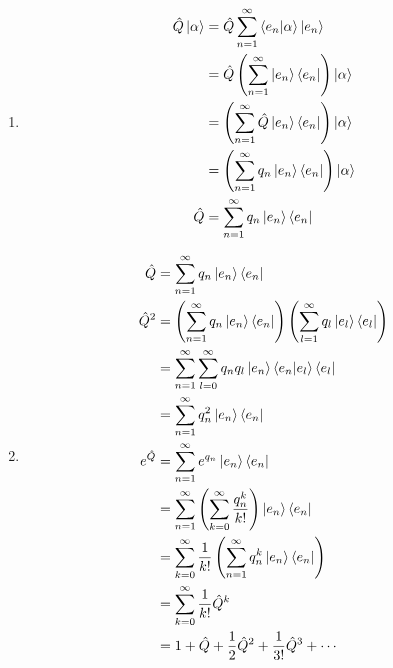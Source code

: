 \documentclass{article}
\begin{document}
\subsection{}

\begin{enumerate}
  \item

        \begin{align*}
          \hat{Q} \ket{\alpha} & = \hat{Q} \sum_{n = 1}^\infty \braket{e_n | \alpha} \ket{e_n}                 \\
                               & = \hat{Q} \left( \sum_{n = 1}^\infty \ket{e_n} \bra{e_n} \right) \ket{\alpha} \\
                               & = \left( \sum_{n = 1}^\infty \hat{Q} \ket{e_n} \bra{e_n} \right) \ket{\alpha} \\
                               & = \left( \sum_{n = 1}^\infty q_n \ket{e_n} \bra{e_n} \right) \ket{\alpha}     \\
          \hat{Q}              & = \sum_{n = 1}^\infty q_n \ket{e_n} \bra{e_n}
        \end{align*}

  \item

        \begin{align*}
          \hat{Q}     & = \sum_{n = 1}^\infty q_n \ket{e_n} \bra{e_n}                                                                           \\
          \hat{Q}^2   & = \left( \sum_{n = 1}^\infty q_n \ket{e_n} \bra{e_n} \right) \left( \sum_{l = 1}^\infty q_l \ket{e_l} \bra{e_l} \right) \\
                      & = \sum_{n = 1}^\infty \sum_{l = 0}^\infty q_n q_l \ket{e_n} \braket{e_n | e_l} \bra{e_l}                                \\
                      & = \sum_{n = 1}^\infty q_n^2 \ket{e_n} \bra{e_n}                                                                         \\
          e^{\hat{Q}} & = \sum_{n = 1}^\infty e^{q_n} \ket{e_n} \bra{e_n}                                                                       \\
                      & = \sum_{n = 1}^\infty \left( \sum_{k = 0}^\infty \frac{q_n^k}{k!} \right) \ket{e_n} \bra{e_n}                           \\
                      & = \sum_{k = 0}^\infty \frac{1}{k!} \left( \sum_{n = 1}^\infty q_n^k \ket{e_n} \bra{e_n} \right)                         \\
                      & = \sum_{k = 0}^\infty \frac{1}{k!} \hat{Q}^k                                                                            \\
                      & = 1 + \hat{Q} + \frac{1}{2} \hat{Q}^2 + \frac{1}{3!} \hat{Q}^3 + \cdots
        \end{align*}
\end{enumerate}
\end{document}
